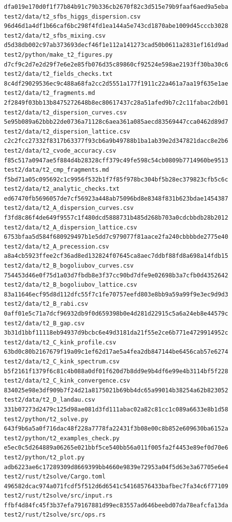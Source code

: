 \documentclass[
  10pt,
]{article}
\begin{document}
\begin{verbatim}
dfa019e170d0f1f77b84b91c79b336cb2670f82c3d515e79b9faaf6aed9a5eba  test2/data/t2_sfbs_higgs_dispersion.csv
96d46d1a4df1b66caf6bc298f4fd1ea144a5e743cd1870abe1009d45cccb3028  test2/data/t2_sfbs_mixing.csv
d5d38db002c97ab373693decf46f1e112a141273cad50b0611a2831ef161d9ad  test2/python/make_t2_figures.py
d7cf9c2d7e2d29f7e6e2e85fb076d35c89860cf92524e598ae2193ff30ba30c6  test2/data/t2_fields_checks.txt
8c4df29029536ec9c488a68fa2cc2d5551a177f1911c22a461a7aa19f635e1ae  test2/data/t2_fragments.md
2f2849f03bb13b8475272648b8ec80617437c28a51afed9b7c2c11fabac2db01  test2/data/t2_dispersion_curves.csv
5e95b089a62bbb22de0736a71128c6aea361a085aecd83569447cca0462d89d7  test2/data/t2_dispersion_lattice.csv
c2c2fcc27332f8317b63377f93cb6a9b49788b1ba1ab39e2d347821dacc8e2b6  test2/data/t2_cvode_accuracy.csv
f85c517a0947ae5f884d4b28328cff379c49fe598c54cb0809b7714960be9513  test2/data/t2_cmp_fragments.md
f5bd71a05c095692c1c9956f532b1f7f85f978bc304bf5b28ec379823cfb5c6c  test2/data/t2_analytic_checks.txt
ed67470fb5696057de7cf56923a448ab75096bd8e8348f831b623bdae1454387  test2/data/t2_A_dispersion_curves.csv
f3fd8c86f4de649f9557c1f480dcd5888731b485d268b703a0cdcbbdb28b2012  test2/data/t2_A_dispersion_lattice.csv
6753bfaa5d584f680929497b1e5dd7c979077f81aace2fa240cbbbbde2775e40  test2/data/t2_A_precession.csv
a8a4cb5923ffee2cf36ad8ed132824f07645ca8aec7ddbf88fd8a698a14fdb15  test2/data/t2_B_bogoliubov_curves.csv
754453d46e0f75d1a03d7fbdb8e3f37cc90bd7dfe9e02698b3a7cfb0d4352642  test2/data/t2_B_bogoliubov_lattice.csv
83a11646ecf95d8d112dfc55f7c1fe70757eefd803e8bb9a59a99f9e3ec9d9d3  test2/data/t2_B_rabi.csv
0aff01e5c71a7dcf96932db9f0d659398b0e4d281d22915c5a6a24eb8e44579c  test2/data/t2_B_gap.csv
3b31d1bbf11118eb94937d9bcbc6e49d3181da21f55e2ce6b771e4729914952c  test2/data/t2_C_kink_profile.csv
63bd0c80b2167679f19a09c1ef62d17ae5a4fea2db847144be6456cab57e6274  test2/data/t2_C_kink_spectrum.csv
b5f2161f1379f6c81c4b088a0df01f620d7b8dd9e9b4df6e99e4b3114bf5f228  test2/data/t2_C_kink_convergence.csv
834025e98e3df909b7f24d21a8175021b69bb4dc65a99014b38254a62b823052  test2/data/t2_D_landau.csv
331b07273d2479c125d98ae081d3fd111abac02a82c81cc1c089a6633e8b1d58  test2/python/t2_solve.py
643f9b6a5a0f716dac48f228a7778fa22431f3b08e00c8b852e609630ba6152a  test2/python/t2_examples_check.py
e5ec0c5d264889a06265e021bbf5ce540bb56a011f005fa2f4453e89ef0d70e6  test2/python/t2_plot.py
adb6223ae6c17289309d8669399bb4660e9839e72953a04f5d63e3a67705e6e4  test2/rust/t2solve/Cargo.toml
496582dcac974a071fcdf5f512d6d6541c54168576433bafbec7fa34c6f77109  test2/rust/t2solve/src/input.rs
ffbf4d84fc45f3b37efa79167881d99ec83557ad646beebd07da78eafcfa13da  test2/rust/t2solve/src/ops.rs

\end{verbatim}
\end{document}
